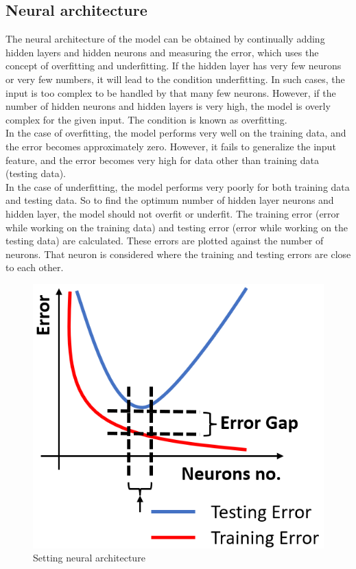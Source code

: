 \documentclass[12pt,a4paper,bold]{thesis}
\theoremstyle{thm}
\theoremstyle{definition}
\begin{document}
\subsection{Neural architecture}
The neural architecture of the model can be obtained by continually adding hidden layers and hidden neurons and measuring the error, which uses the concept of overfitting and underfitting. If the hidden layer has very few neurons or very few numbers, it will lead to the condition underfitting. In such cases, the input is too complex to be handled by that many few neurons. However, if the number of hidden neurons and hidden layers is very high, the model is overly complex for the given input. The condition is known as overfitting.\\ 
In the case of overfitting, the model performs very well on the training data, and the error becomes approximately zero. However, it fails to generalize the input feature, and the error becomes very high for data other than training data (testing data).\\ 
In the case of underfitting, the model performs very poorly for both training data and testing data. 
So to find the optimum number of hidden layer neurons and hidden layer, the model should not overfit or underfit. The training error (error while working on the training data) and testing error (error while working on the testing data) are calculated. These errors are plotted against the number of neurons. That neuron is considered where the training and testing errors are close to each other.
\begin{figure}[H]
	\centering
   \includegraphics[scale=0.56]{Images/39.png} 
   \caption{Setting neural architecture}
\end{figure}
\end{document}
